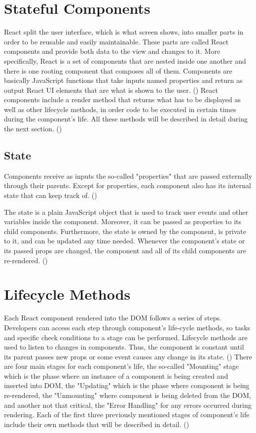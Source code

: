 \section{Stateful Components}

React split the user interface, which is what screen shows, into smaller parts in order to be reusable and easily maintainable. These parts are called React components and provide both data to the view and changes to it. More specifically, React is a set of components that are nested inside one another and there is one rooting component that composes all of them. Components are basically JavaScript functions that take inputs named properties and return as output React UI elements that are what is shown to the user. (\cite{Reference14})  React components include a render method that returns what has to be displayed as well as other lifecycle methods, in order code to be executed in certain times during the component's life. All these methods will be described in detail during the next section. (\cite{Reference16}) \par

\subsection{State}
Components receive as inputs the so-called "properties" that are passed externally through their parents. Except for properties, each component also has its internal state that can keep track of. (\cite{Reference13}) \par 
The state is a plain JavaScript object that is used to track user events and other variables inside the component. Moreover, it can be passed as properties to its child components. Furthermore, the state is owned by the component, is private to it, and can be updated any time needed. Whenever the component's state or its passed props are changed, the component and all of its child components are re-rendered. (\cite{Reference10}) \par

\section{Lifecycle Methods}

Each React component rendered into the DOM follows a series of steps. Developers can access each step through component's life-cycle methods, so tasks and specific check conditions to a stage can be performed. Lifecycle methods are used to listen to changes in components. Thus, the component is constant until its parent passes new props or some event causes any change in its state. (\cite{Reference13}) There are four main stages for each component's life, the so-called "Mounting" stage which is the phase where an instance of a component is being created and inserted into DOM, the "Updating" which is the phase where component is being re-rendered, the "Unmounting" where component is being deleted from the DOM, and another not that critical, the "Error Handling" for any errors occurred during rendering. Each of the first three previously mentioned stages of component's life include their own methods that will be described in detail. (\cite{Reference16})  \par

